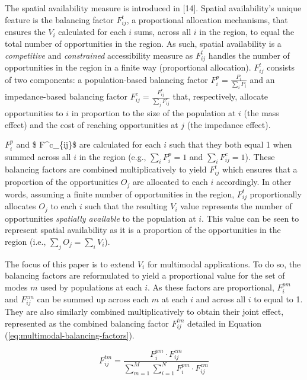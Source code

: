 \documentclass[10pt,letterpaper]{article}
\begin{document}
The spatial availability measure is introduced in {[}14{]}. Spatial
availability's unique feature is the balancing factor \(F^t_{ij}\), a
proportional allocation mechanisms, that ensures the \(V_i\) calculated
for each \(i\) sums, across all \(i\) in the region, to equal the total
number of opportunities in the region. As such, spatial availability is
a \emph{competitive} and \emph{constrained} accessibility measure as
\(F^t_{ij}\) handles the number of opportunities in the region in a
finite way (proportional allocation). \(F^t_{ij}\) consists of two
components: a population-based balancing factor
\(F^p_{i} = \frac{P_i}{\sum_i P_i}\) and an impedance-based balancing
factor \(F^c_{ij} = \frac{F^c_{ij}}{\sum_j F^c_{ij}}\) that,
respectively, allocate opportunities to \(i\) in proportion to the size
of the population at \(i\) (the mass effect) and the cost of reaching
opportunities at \(j\) (the impedance effect).

\(F^p_{i}\) and \$ F\^{}c\_\{ij\}\$ are calculated for each \(i\) such
that they both equal 1 when summed across all \(i\) in the region (e.g.,
\(\sum_i F^p_{i} = 1\) and \(\sum_i F^c_{ij} = 1\)). These balancing
factors are combined multiplicatively to yield \(F^t_{ij}\) which
ensures that a proportion of the opportunities \(O_j\) are allocated to
each \(i\) accordingly. In other words, assuming a finite number of
opportunities in the region, \(F^t_{ij}\) proportionally allocates
\(O_j\) to each \(i\) such that the resulting \(V_i\) value represents
the number of opportunities \emph{spatially available} to the population
at \(i\). This value can be seen to represent spatial availability as it
is a proportion of the opportunities in the region (i.e.,
\(\sum_j O_j = \sum_i V_i\)).

The focus of this paper is to extend \(V_i\) for multimodal
applications. To do so, the balancing factors are reformulated to yield
a proportional value for the set of modes \(m\) used by populations at
each \(i\). As these factors are proportional, \(F^{pm}_{i}\) and
\(F^{cm}_{ij}\) can be summed up across each \(m\) at each \(i\) and
across all \(i\) to equal to 1. They are also similarly combined
multiplicatively to obtain their joint effect, represented as the
combined balancing factor \(F^{tm}_{ij}\) detailed in Equation
(\ref{eq:multimodal-balancing-factors}).

\begin{equation}
\label{eq:multimodal-balancing-factors}
F^{tm}_{ij} = \frac{F^{pm}_{i} \cdot F^{cm}_{ij}}{\sum_{m=1}^M \sum_{i=1}^N F^{pm}_{i} \cdot F^{cm}_{ij}}
\end{equation}
\end{document}
